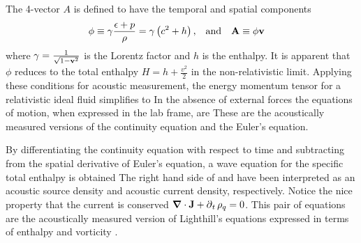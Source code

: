 The 4-vector $A$ is defined to have the temporal and spatial components 
\begin{align}
  \phi &\equiv \gamma \frac{\epsilon + p}{\rho} = \gamma\left( c^2 + h \right), &&\text{and}&\textbf{A} &\equiv\phi \textbf{v} 
\end{align}
where  $\gamma = \frac{1}{\sqrt{1-\textbf{v}^2}}$ is the Lorentz factor and $h$ is the enthalpy.
It is apparent that $\phi$ reduces to the total enthalpy $H = h+ \frac{v^2}{2}$ in the non-relativistic limit.
Applying these conditions for acoustic measurement,
the energy momentum tensor for a relativistic ideal fluid simplifies to
In the absence of external forces the equations of motion, when expressed in the lab frame, are
These are the acoustically measured versions of the continuity equation and the Euler's equation.

By differentiating the continuity equation with respect to time
and subtracting from the spatial derivative of Euler's equation, 
a wave equation for the specific total enthalpy is obtained
The right hand side of  and   have been interpreted as an acoustic source density and acoustic current density, respectively.
Notice the nice property that the current is conserved $\mbox{\boldmath $\nabla$}\cdot \mathbf{J} + \operatorname{\partial}_t \rho_q = 0$.
This pair of equations are the acoustically measured version of Lighthill's equations expressed in terms of enthalpy and vorticity \cite{Howe1998}.

